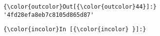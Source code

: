 \documentclass[11pt]{article}
\begin{document}
            \begin{Verbatim}[commandchars=\\\{\}]
{\color{outcolor}Out[{\color{outcolor}44}]:} '4fd28efa8eb7c8105d865d87'
\end{Verbatim}
        
    \begin{Verbatim}[commandchars=\\\{\}]
{\color{incolor}In [{\color{incolor} }]:} 
\end{Verbatim}


    
    
    
    
\end{document}
